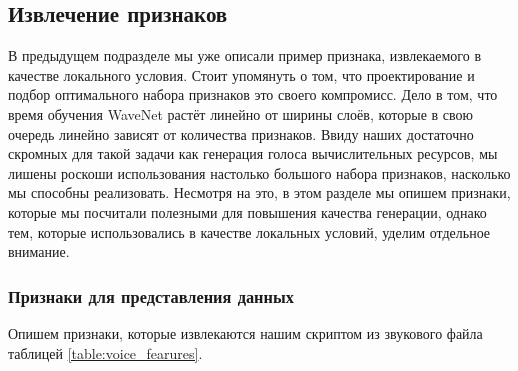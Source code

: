 \documentclass[../diploma.tex]{subfiles}
\begin{document}
\newpage
\subsection{Извлечение признаков}
В предыдущем подразделе мы уже описали пример признака, извлекаемого в качестве локального условия. Стоит упомянуть о том, что проектирование и подбор оптимального набора признаков это своего компромисс. 
Дело в том, что время обучения WaveNet растёт линейно от ширины слоёв, которые в свою очередь линейно зависят от количества признаков. Ввиду наших достаточно скромных для такой задачи как генерация голоса вычислительных ресурсов, мы лишены роскоши использования настолько большого набора признаков, насколько мы способны реализовать.
Несмотря на это, в этом разделе мы опишем признаки, которые мы посчитали полезными для повышения качества генерации, однако тем, которые использовались в качестве локальных условий, уделим отдельное внимание.


\subsubsection{Признаки для представления данных}
Опишем признаки, которые извлекаются нашим скриптом из звукового файла таблицей \ref{table:voice_fearures}.
\end{document}
